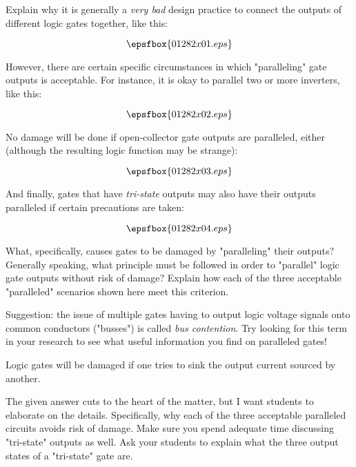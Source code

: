 

Explain why it is generally a {\it very bad} design practice to connect the outputs of different logic gates together, like this:

$$\epsfbox{01282x01.eps}$$

However, there are certain specific circumstances in which "paralleling" gate outputs is acceptable.  For instance, it is okay to parallel two or more inverters, like this:

$$\epsfbox{01282x02.eps}$$

No damage will be done if open-collector gate outputs are paralleled, either (although the resulting logic function may be strange):

$$\epsfbox{01282x03.eps}$$

And finally, gates that have {\it tri-state} outputs may also have their outputs paralleled if certain precautions are taken:

$$\epsfbox{01282x04.eps}$$

What, specifically, causes gates to be damaged by "paralleling" their outputs?  Generally speaking, what principle must be followed in order to "parallel" logic gate outputs without risk of damage?  Explain how each of the three acceptable "paralleled" scenarios shown here meet this criterion.

Suggestion: the issue of multiple gates having to output logic voltage signals onto common conductors ("busses") is called {\it bus contention}.  Try looking for this term in your research to see what useful information you find on paralleled gates!







Logic gates will be damaged if one tries to sink the output current sourced by another.







The given answer cuts to the heart of the matter, but I want students to elaborate on the details.  Specifically, why each of the three acceptable paralleled circuits avoids risk of damage.  Make sure you spend adequate time discussing "tri-state" outputs as well.  Ask your students to explain what the three output states of a "tri-state" gate are.




